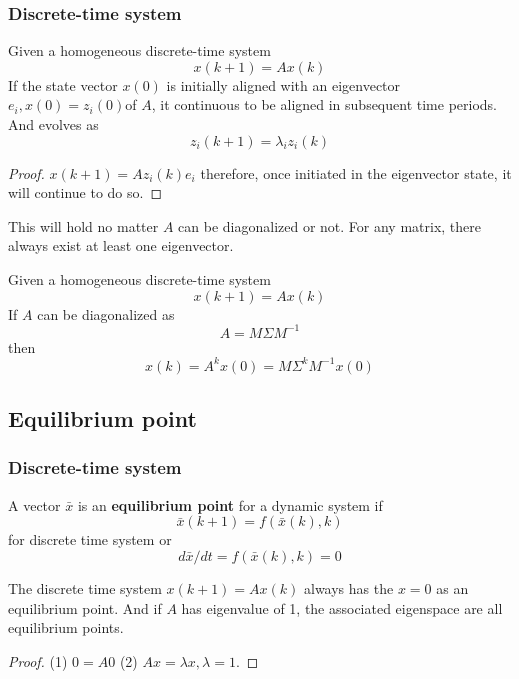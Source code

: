 \begin{refsection}
\subsubsection{Discrete-time system}
\begin{theorem}
\cite[136]{luenberger1979introduction}Given a homogeneous discrete-time system
$$x(k+1) = Ax(k)$$
If the state vector $x(0)$ is initially aligned with an eigenvector $e_i,x(0)=z_i(0) $of $A$, it continuous to be aligned in subsequent time periods. And evolves as
$$z_i(k+1) = \lambda_i z_i(k) $$
\end{theorem}
\begin{proof}
$x(k+1) = Az_i(k)e_i$ therefore, once initiated in the eigenvector state, it will continue to do so.	
\end{proof}


\begin{remark}
This will hold no matter $A$ can be diagonalized or not. For any matrix, there always exist at least one eigenvector. 
\end{remark}

\begin{theorem}
Given a homogeneous discrete-time system
$$x(k+1) = Ax(k)$$
If $A$ can be diagonalized as
$$A = M\Sigma M^{-1}$$
then
$$x(k) = A^k x(0) = M\Sigma^k M^{-1}x(0)$$
\end{theorem}





\subsection{Equilibrium point}
\subsubsection{Discrete-time system}
\begin{definition}
A vector $\bar{x}$ is an \textbf{equilibrium point} for a dynamic system if
$$\bar{x}(k+1) = f(\bar{x}(k),k)$$
for discrete time system or
$$d\bar{x}/dt = f(\bar{x}(k),k) = 0$$
\end{definition}

\begin{lemma}
\cite[151]{luenberger1979introduction}
The discrete time system $x(k+1)=Ax(k)$ always has the $x=0$ as an equilibrium point. And if $A$ has eigenvalue of 1, the associated eigenspace are all equilibrium points. 
\end{lemma}
\begin{proof}
(1) $0 = A0$ (2) $Ax = \lambda x,\lambda = 1$.	
\end{proof}



\end{refsection}
